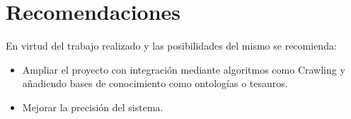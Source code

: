 \documentclass[runningheads]{llncs}
\begin{document}
	\section{Recomendaciones}
	En virtud del trabajo realizado y las posibilidades del mismo se recomienda:
	\begin{itemize}
	\item Ampliar el proyecto con integración mediante algoritmos como Crawling y añadiendo bases de conocimiento como ontologías o tesauros.
	\item Mejorar la precisión del sistema.
	\end{itemize}
	\begin{thebibliography}{1}
		
	\end{thebibliography}
\end{document}
